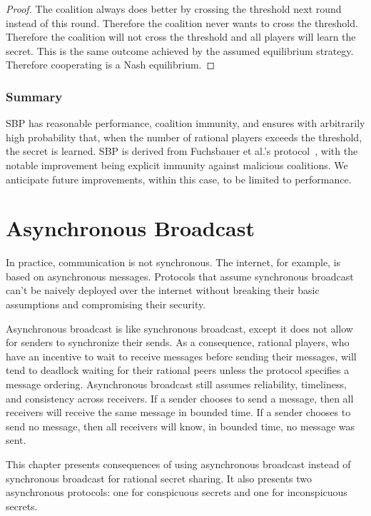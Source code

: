 \documentclass[12pt]{dalcsthesis}
\begin{document}
\begin{proof}
The coalition always does better by crossing the threshold next round instead of this round. Therefore the coalition never wants to cross the threshold. Therefore the coalition will not cross the threshold and all players will learn the secret. This is the same outcome achieved by the assumed equilibrium strategy. Therefore cooperating is a Nash equilibrium.
\end{proof}


\subsection{Summary}

SBP has reasonable performance, coalition immunity, and ensures with arbitrarily high probability that, when the number of rational players exceeds the threshold, the secret is learned. SBP is derived from Fuchsbauer et al.'s protocol~\cite{fuch10}, with the notable improvement being explicit immunity against malicious coalitions. We anticipate future improvements, within this case, to be limited to performance.






\chapter{Asynchronous Broadcast}
\label{chapter:Asynchronous}

In practice, communication is not synchronous. The internet, for example, is based on asynchronous messages. Protocols that assume synchronous broadcast can't be naively deployed over the internet without breaking their basic assumptions and compromising their security.

Asynchronous broadcast is like synchronous broadcast, except it does not allow for senders to synchronize their sends. As a consequence, rational players, who have an incentive to wait to receive messages before sending their messages, will tend to deadlock waiting for their rational peers unless the protocol specifies a message ordering. Asynchronous broadcast still assumes reliability, timeliness, and consistency across receivers. If a sender chooses to send a message, then all receivers will receive the same message in bounded time. If a sender chooses to send no message, then all receivers will know, in bounded time, no message was sent.

This chapter presents consequences of using asynchronous broadcast instead of synchronous broadcast for rational secret sharing. It also presents two asynchronous protocols: one for conspicuous secrets and one for inconspicuous secrets.
\end{document}

